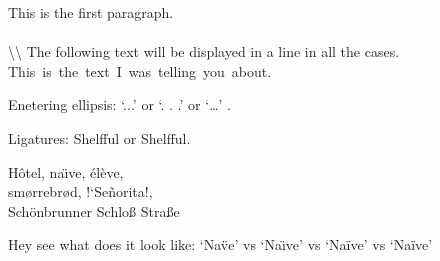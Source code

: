 \documentclass[11pt,fleqn,a4paper,draft]{article}
\begin{document}
This is the first paragraph.\\
\\
\textbackslash\textbackslash
The following text will be displayed in a line in all the cases. \mbox{This is the text I was telling you about.} 

Enetering ellipsis: `...' or `. . .' or `\ldots' .

Ligatures:
Shelfful or Shelf\mbox{}ful.

H\^otel, na\"\i ve, \'el\`eve,\\
sm\o rrebr\o d, !`Se\~norita!,\\
Sch\"onbrunner Schlo\ss{}
Stra\ss e

Hey see what does it look like: `Na\"ve' vs `Na\"\i ve' vs `Na\"  ive' vs `Na\"       ive'
\end{document}
